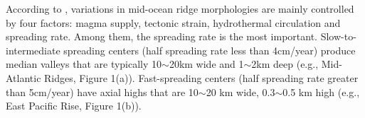 \documentclass[12pt]{article}
\begin{document}
According to \citet{Fowler2004}, variations in  mid-ocean ridge morphologies are mainly controlled by four factors: magma supply, tectonic strain, hydrothermal circulation and spreading rate. Among them, the spreading rate is the most important. Slow-to-intermediate spreading centers (half spreading rate less than 4cm/year) produce median valleys that are typically 10$\sim$20km wide and 1$\sim$2km deep (e.g., Mid-Atlantic Ridges, Figure 1(a)). Fast-spreading centers (half spreading rate greater than 5cm/year) have axial highs that are 10$\sim$20 km wide, 0.3$\sim$0.5 km high (e.g., East Pacific Rise, Figure 1(b)).
\end{document}
